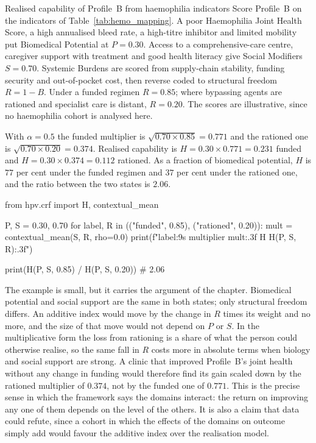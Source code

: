 \begin{workedexample}{Realised capability of Profile~B from haemophilia indicators}
Score Profile~B on the indicators of Table~\ref{tab:hemo_mapping}. A poor
Haemophilia Joint Health Score, a high annualised bleed rate, a high-titre
inhibitor and limited mobility put Biomedical Potential at $P=0.30$. Access to
a comprehensive-care centre, caregiver support with treatment and good health
literacy give Social Modifiers $S=0.70$. Systemic Burdens are scored from supply-chain stability, funding
security and out-of-pocket cost, then reverse coded to structural freedom
$R=1-B$. Under a funded regimen $R=0.85$; where bypassing agents are rationed
and specialist care is distant, $R=0.20$. The scores are
illustrative, since no haemophilia cohort is analysed here.

With $\alpha=0.5$ the funded multiplier is $\sqrt{0.70\times0.85}=0.771$ and
the rationed one is $\sqrt{0.70\times0.20}=0.374$. Realised capability is
$H=0.30\times0.771=0.231$ funded and $H=0.30\times0.374=0.112$ rationed. As a
fraction of biomedical potential, $H$ is $77$ per cent under the funded regimen
and $37$ per cent under the rationed one, and the ratio between the two states is $2.06$.

\begin{wecode}[Python]
from hpv.crf import H, contextual_mean

P, S = 0.30, 0.70
for label, R in (("funded", 0.85), ("rationed", 0.20)):
    mult = contextual_mean(S, R, rho=0.0)
    print(f"{label:9s} multiplier {mult:.3f}  H {H(P, S, R):.3f}")

print(H(P, S, 0.85) / H(P, S, 0.20))    # 2.06
\end{wecode}

\end{workedexample}

The example is small, but it carries the argument of the chapter. Biomedical potential and social support are the same in both states; only structural freedom differs. An additive index would move by the change in $R$ times its weight and no more, and the size of that move would not depend on $P$ or $S$. In the multiplicative form the loss from rationing is a share of what the person could otherwise realise, so the same fall in $R$ costs more in absolute terms when biology and social support are strong. A clinic that improved Profile~B's joint health without any change in funding would therefore find its gain scaled down by the rationed multiplier of $0.374$, not by the funded one of $0.771$. This is the precise sense in which the framework says the domains interact: the return on improving any one of them depends on the level of the others. It is also a claim that data could refute, since a cohort in which the effects of the domains on outcome simply add would favour the additive index over the realisation model.

